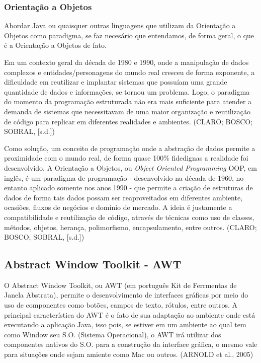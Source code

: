 \documentclass[a4paper,12pt]{article}
\begin{document}
\subsubsection{Orientação a Objetos}
Abordar Java ou quaisquer outras linguagens que utilizam da Orientação a Objetos como paradigma, se faz necesário que entendamos, de forma geral,
o que é a Orientação a Objetos de fato.

Em um contexto geral da década de 1980 e 1990, onde a manipulação de dados complexos e entidades/personagens do mundo real cresceu de forma exponente,
a dificuldade em reutilizar e implantar sistemas que possuíam uma grande quantidade de dados e informações, se tornou um problema. Logo, o paradigma do momento 
da programação estruturada não era mais suficiente para atender a demanda de sistemas que necessitavam de uma maior organização e reutilização de código 
para replicar em diferentes realidades e ambientes. (CLARO; BOSCO; SOBRAL, [s.d.])

Como solução, um conceito de programação onde a abstração de dados permite a proximidade com o mundo real, de forma quase 100\% fidedignas a realidade foi desenvolvido.
A Orientação a Objetos, ou \textit{Object Oriented Programming} OOP, em inglês, é um paradigma de programação - desenvolvido na década de 1960, no entanto aplicado somente 
nos anos 1990 - que permite a criação de estruturas de dados de forma tais dados possam ser reaproveitados em diferentes 
ambiente, ocasiões, fluxos de negócios e domínio de mercado. A ideia é justamente a compatibilidade e reutilização de código,
através de técnicas como uso de classes, métodos, objetos, herança, polimorfismo, encapsulamento, entre outros. (CLARO; BOSCO; SOBRAL, [s.d.])


\subsection{Abstract Window Toolkit - AWT}
O Abstract Window Toolkit, ou AWT (em português Kit de Ferrmentas de Janela Abstrata), permite o desenvolvimento de interfaces gráficas por 
meio do uso de componentes como botões, campos de texto, rótulos, entre outros. A principal característica do AWT é o fato de sua adaptação ao 
ambiente onde está executando a aplicação Java, isso pois, se estiver em um ambiente ao qual tem como Window seu S.O. (Sistema Operacional),
o AWT irá utilizar dos componentes nativos do S.O. para a construção da interface gráfica, o mesmo vale para situações onde sejam amiente como Mac ou outros.
(ARNOLD et al., 2005)
\end{document}
